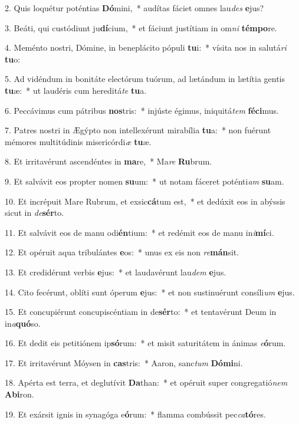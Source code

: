 2. Quis loquétur poténtias \textbf{Dó}mini,~*  audítas fáciet omnes lau\textit{des} \textbf{e}jus?\

3. Beáti, qui custódiunt ju\textbf{dí}cium,~*  et fáciunt justítiam in om\textit{ni} \textbf{tém}\textbf{po}re.\

4. Meménto nostri, Dómine, in beneplácito pópuli \textbf{tu}i:~*  vísita nos in salutá\textit{ri} \textbf{tu}o:\

5. Ad vidéndum in bonitáte electórum tuórum, ad lætándum in lætítia gentis \textbf{tu}æ:~*  ut laudéris cum hereditá\textit{te} \textbf{tu}a.\

6. Peccávimus cum pátribus \textbf{nos}tris:~*  injúste égimus, iniquitá\textit{tem} \textbf{fé}\textbf{ci}mus.\

7. Patres nostri in Ægýpto non intellexérunt mirabília \textbf{tu}a:~*  non fuérunt mémores multitúdinis misericórdi\textit{æ} \textbf{tu}æ.\

8. Et irritavérunt ascendéntes in \textbf{ma}re,~*  Ma\textit{re} \textbf{Ru}brum.\

9. Et salvávit eos propter nomen \textbf{su}um:~*  ut notam fáceret poténti\textit{am} \textbf{su}am.\

10. Et incrépuit Mare Rubrum, et exsic\textbf{cá}tum est,~*  et dedúxit eos in abýssis sicut in \textit{de}\textbf{sér}to.\

11. Et salvávit eos de manu odi\textbf{én}tium:~*  et redémit eos de manu in\textit{i}\textbf{mí}ci.\

12. Et opéruit aqua tribulántes \textbf{e}os:~*  unus ex eis non \textit{re}\textbf{mán}sit.\

13. Et credidérunt verbis \textbf{e}jus:~*  et laudavérunt lau\textit{dem} \textbf{e}jus.\

14. Cito fecérunt, oblíti sunt óperum \textbf{e}jus:~*  et non sustinuérunt consíli\textit{um} \textbf{e}jus.\

15. Et concupiérunt concupiscéntiam in de\textbf{sér}to:~*  et tentavérunt Deum in in\textit{a}\textbf{quó}so.\

16. Et dedit eis petitiónem ip\textbf{só}rum:~*  et misit saturitátem in ánimas \textit{e}\textbf{ó}rum.\

17. Et irritavérunt Móysen in \textbf{cas}tris:~*  Aaron, sanc\textit{tum} \textbf{Dó}\textbf{mi}ni.\

18. Apérta est terra, et deglutívit \textbf{Da}than:~*  et opéruit super congregatió\textit{nem} \textbf{Ab}\textbf{i}ron.\

19. Et exársit ignis in synagóga e\textbf{ó}rum:~*  flamma combússit pec\textit{ca}\textbf{tó}res.\

